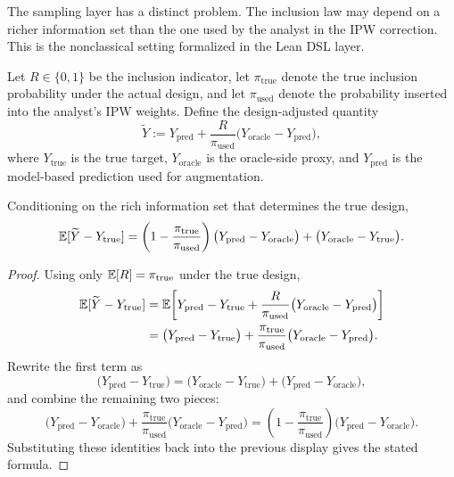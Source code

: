 The sampling layer has a distinct problem. The inclusion law may depend on a
richer information set than the one used by the analyst in the IPW correction.
This is the nonclassical setting formalized in the Lean DSL layer.

Let $R\in\{0,1\}$ be the inclusion indicator, let $\pi_{\mathrm{true}}$ denote
the true inclusion probability under the actual design, and let
$\pi_{\mathrm{used}}$ denote the probability inserted into the analyst's IPW
weights. Define the design-adjusted quantity
\[
\widetilde Y
:=
Y_{\mathrm{pred}}
+
\frac{R}{\pi_{\mathrm{used}}}
\big(Y_{\mathrm{oracle}}-Y_{\mathrm{pred}}\big),
\]
where $Y_{\mathrm{true}}$ is the true target, $Y_{\mathrm{oracle}}$ is the
oracle-side proxy, and $Y_{\mathrm{pred}}$ is the model-based prediction used
for augmentation.

\begin{proposition}
\label{prop:proxy-aware-residual}
Conditioning on the rich information set that determines the true design,
\[
\mathbb{E}[\widetilde Y - Y_{\mathrm{true}}]
=
\left(1-\frac{\pi_{\mathrm{true}}}{\pi_{\mathrm{used}}}\right)
\big(Y_{\mathrm{pred}}-Y_{\mathrm{oracle}}\big)
+
\big(Y_{\mathrm{oracle}}-Y_{\mathrm{true}}\big).
\]
\end{proposition}

\begin{proof}
Using only $\mathbb{E}[R]=\pi_{\mathrm{true}}$ under the true design,
\begin{align*}
\mathbb{E}[\widetilde Y - Y_{\mathrm{true}}]
&=
\mathbb{E}\!\left[
Y_{\mathrm{pred}} - Y_{\mathrm{true}}
+
\frac{R}{\pi_{\mathrm{used}}}
\big(Y_{\mathrm{oracle}}-Y_{\mathrm{pred}}\big)
\right] \\
&=
\big(Y_{\mathrm{pred}} - Y_{\mathrm{true}}\big)
+
\frac{\pi_{\mathrm{true}}}{\pi_{\mathrm{used}}}
\big(Y_{\mathrm{oracle}}-Y_{\mathrm{pred}}\big).
\end{align*}
Rewrite the first term as
\[
\big(Y_{\mathrm{pred}} - Y_{\mathrm{true}}\big)
=
\big(Y_{\mathrm{oracle}} - Y_{\mathrm{true}}\big)
+
\big(Y_{\mathrm{pred}} - Y_{\mathrm{oracle}}\big),
\]
and combine the remaining two pieces:
\[
\big(Y_{\mathrm{pred}} - Y_{\mathrm{oracle}}\big)
+
\frac{\pi_{\mathrm{true}}}{\pi_{\mathrm{used}}}
\big(Y_{\mathrm{oracle}} - Y_{\mathrm{pred}}\big)
=
\left(1-\frac{\pi_{\mathrm{true}}}{\pi_{\mathrm{used}}}\right)
\big(Y_{\mathrm{pred}} - Y_{\mathrm{oracle}}\big).
\]
Substituting these identities back into the previous display gives the stated
formula.
\end{proof}

